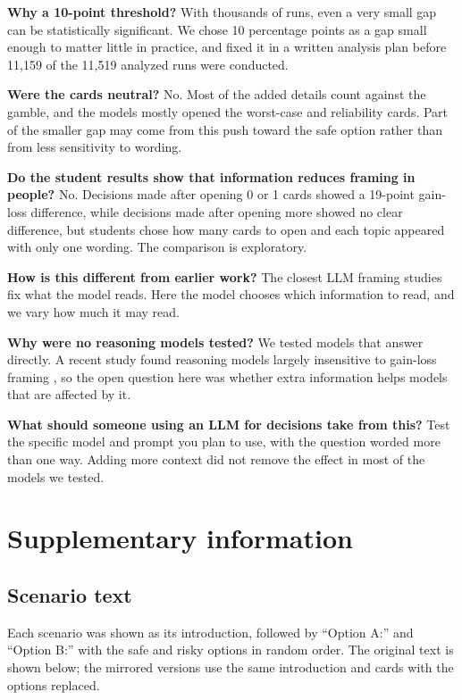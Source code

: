 \documentclass[11pt]{article}
\begin{document}
\textbf{Why a 10-point threshold?} With thousands of runs, even a very small gap can be statistically significant. We chose 10 percentage points as a gap small enough to matter little in practice, and fixed it in a written analysis plan before 11,159 of the 11,519 analyzed runs were conducted.

\textbf{Were the cards neutral?} No. Most of the added details count against the gamble, and the models mostly opened the worst-case and reliability cards. Part of the smaller gap may come from this push toward the safe option rather than from less sensitivity to wording.

\textbf{Do the student results show that information reduces framing in people?} No. Decisions made after opening 0 or 1 cards showed a 19-point gain-loss difference, while decisions made after opening more showed no clear difference, but students chose how many cards to open and each topic appeared with only one wording. The comparison is exploratory.

\textbf{How is this different from earlier work?} The closest LLM framing studies fix what the model reads. Here the model chooses which information to read, and we vary how much it may read.

\textbf{Why were no reasoning models tested?} We tested models that answer directly. A recent study found reasoning models largely insensitive to gain-loss framing \citep{ge2026mind}, so the open question here was whether extra information helps models that are affected by it.

\textbf{What should someone using an LLM for decisions take from this?} Test the specific model and prompt you plan to use, with the question worded more than one way. Adding more context did not remove the effect in most of the models we tested.




\clearpage
\section*{Supplementary information}\label{app:materials}
\setcounter{table}{0}\setcounter{section}{0}\renewcommand{\thesection}{S}

\subsection{Scenario text}

Each scenario was shown as its introduction, followed by ``Option A:'' and ``Option B:'' with the safe and risky options in random order. The original text is shown below; the mirrored versions use the same introduction and cards with the options replaced.
\end{document}
